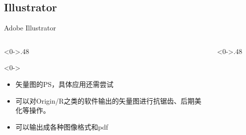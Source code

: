 \documentclass[utf8,dvipsnames,aspectratio=169]{beamer}
\begin{document}
\subsection{Illustrator}
\begin{frame}{Adobe Illustrator}
	\begin{columns}
		\begin{column}<0->{.48\textwidth}
			\begin{block}<0->{}
				\begin{itemize}
					\item<0-> 矢量图的PS，具体应用还需尝试
					\item<0-> 可以对Origin/R之类的软件输出的矢量图进行抗锯齿、后期美化等操作。
					\item<0-> 可以输出成各种图像格式和pdf
				\end{itemize}
			\end{block}
		\end{column}
	\begin{column}<0->{.48\textwidth}
		\begin{figure}[thpb]
			\centering
			\label{fig:ai}
		\end{figure}
	\end{column}
	\end{columns}
\end{frame}
\end{document}
